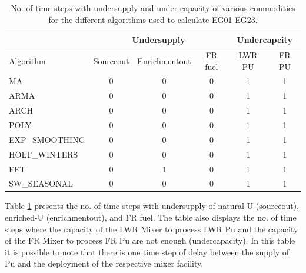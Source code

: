 \documentclass[11pt,letterpaper]{article}
\begin{document}
\begin{table}[!h]
	\centering
	\caption {No. of time steps with undersupply and under capacity of various commodities for the different algorithms used to calculate EG01-EG23.}
	\label{tab:23-commod}
	\begin{tabular}{|l|c|c|c|c|c|}
		\hline
		& \multicolumn{3}{c|}{Undersupply} & \multicolumn{2}{c|}{Undercapcity} \\ \hline
		Algorithm & Sourceout & Enrichmentout & FR fuel & LWR PU & FR PU \\ \hline
		MA        & 0 & 0 & 0 & 1 & 1 \\ \hline
		ARMA      & 0 & 0 & 0 & 1 & 1 \\ \hline
		ARCH      & 0 & 0 & 0 & 1 & 1 \\ \hline
		POLY      & 0 & 0 & 0 & 1 & 1 \\ \hline
		EXP\_SMOOTHING & 0 & 0 & 0 & 1 & 1 \\ \hline
		HOLT\_WINTERS  & 0 & 0 & 0 & 1 & 1 \\ \hline
		FFT       & 0 & 1 & 0 & 1 & 1 \\ \hline
		SW\_SEASONAL  & 0 & 0 & 0 & 1 & 1 \\ \hline
	\end{tabular}
\end{table}

Table \ref{tab:23-commod} presents the no. of time steps with undersupply of natural-U (sourceout), enriched-U (enrichmentout), and FR fuel. The table also displays the no. of time steps where the capacity of the LWR Mixer to process LWR Pu and the capacity of the FR Mixer to process FR Pu are not enough (undercapacity). In this table it is possible to note that there is one time step of delay between the supply of Pu and the deployment of the respective mixer facility.
\end{document}
